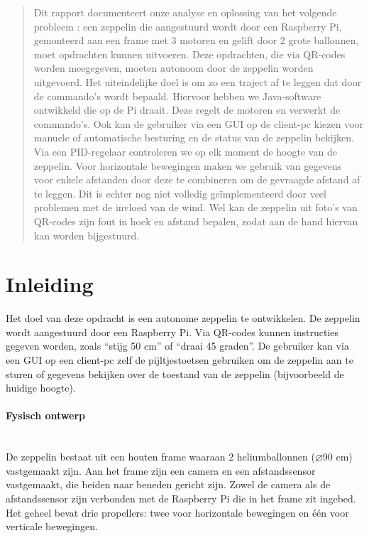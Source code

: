 \documentclass[eind]{penoverslag}
\begin{document}
\maketitlepage


\begin{abstract}
\noindent
Dit rapport documenteert onze analyse en oplossing van het volgende probleem : een zeppelin die aangestuurd wordt door een Raspberry Pi, gemonteerd aan een frame met 3 motoren en   gelift door 2 grote ballonnen, moet opdrachten kunnen uitvoeren. Deze opdrachten, die via QR-codes worden meegegeven, moeten autonoom door de zeppelin worden uitgevoerd. Het uiteindelijke doel is om zo een traject af te leggen dat door de commando's wordt bepaald. Hiervoor hebben we Java-software ontwikkeld die op de Pi draait. Deze regelt de motoren en verwerkt de commando's. Ook kan de gebruiker via een GUI op de client-pc kiezen voor manuele of automatische besturing en de status van de zeppelin bekijken. \\
Via een PID-regelaar controleren we op elk moment de hoogte van de zeppelin. Voor horizontale bewegingen maken we gebruik van gegevens voor enkele afstanden door deze te combineren om de gevraagde afstand af te leggen. Dit is echter nog niet volledig ge\"implementeerd door veel problemen met de invloed van de wind. Wel kan de zeppelin uit foto's van QR-codes zijn fout in hoek en afstand bepalen, zodat aan de hand hiervan kan worden bijgestuurd.
\end{abstract}


\tableofcontents\newpage


\section{Inleiding}
Het doel van deze opdracht is een autonome zeppelin te ontwikkelen. De zeppelin wordt aangestuurd door een Raspberry Pi. Via QR-codes kunnen instructies gegeven worden, zoals ``stijg 50 cm'' of ``draai 45   graden''. De gebruiker kan via een GUI op een client-pc zelf de pijltjestoetsen gebruiken om de zeppelin aan te sturen of gegevens bekijken over de toestand van de zeppelin (bijvoorbeeld de huidige hoogte).

\paragraph{Fysisch ontwerp}
~\\ 
De zeppelin bestaat uit een houten frame waaraan 2 heliumballonnen ($\diameter$90 cm) vastgemaakt zijn. Aan het frame zijn een camera en een afstandssensor vastgemaakt, die beiden naar beneden gericht zijn. Zowel de camera als de afstandssensor zijn verbonden met de Raspberry Pi die in het frame zit ingebed. Het geheel bevat drie propellers: twee voor horizontale bewegingen en \'{e}\'{e}n voor verticale bewegingen.
\end{document}
